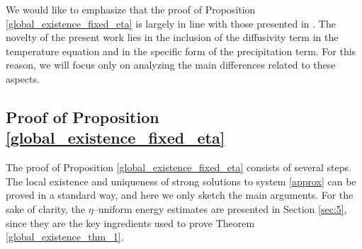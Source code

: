 \documentclass[11pt, a4paper, article,reqno,]{amsart}
\theoremstyle{remark}
\numberwithin{equation}{section}
\begin{document}
We would like to emphasize that the proof of Proposition \ref{global_existence_fixed_eta} is largely in line with those presented in \cite{LT, LT2}. The novelty of the present work lies in the inclusion of the diffusivity term in the temperature equation and in the specific form of the precipitation term. For this reason, we will focus only on analyzing the main differences related to these aspects.





\subsection*{Proof of Proposition \ref{global_existence_fixed_eta}}
The proof of Proposition \ref{global_existence_fixed_eta} consists of several steps. The local existence and uniqueness of strong solutions to system \eqref{approx} can be proved in a standard way, and here we only sketch the main arguments. For the sake of clarity, the $\eta$–uniform energy estimates are presented in Section \ref{sec:5}, since they are the key ingredients used to prove Theorem \ref{global_existence_thm_1}.
\end{document}
